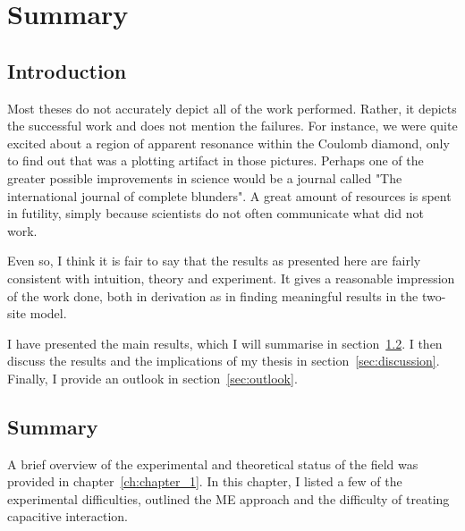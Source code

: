 \chapter{Summary}
\label{ch:chapter_5}





\newpage
\section{Introduction}
Most theses do not accurately depict all of the work performed. Rather, it depicts the successful work and does not mention the failures. For instance, we were quite excited about a region of apparent resonance within the Coulomb diamond, only to find out that was a plotting artifact in those pictures. Perhaps one of the greater possible improvements in science would be a journal called "The international journal of complete blunders". A great amount of resources is spent in futility, simply because scientists do not often communicate what did not work.

Even so, I think it is fair to say that the results as presented here are fairly consistent with intuition, theory and experiment. It gives a reasonable impression of the work done, both in derivation as in finding meaningful results in the two-site model. 

I have presented the main results, which I will summarise in section~\ref{sec:summary}. I then discuss the results and the implications of my thesis in section~\ref{sec:discussion}. Finally, I provide an outlook in section~\ref{sec:outlook}.


\section{Summary}
\label{sec:summary}
A brief overview of the experimental and theoretical status of the field was provided in chapter~\ref{ch:chapter_1}. In this chapter, I listed a few of the experimental difficulties, outlined the ME approach and the difficulty of treating capacitive interaction.


